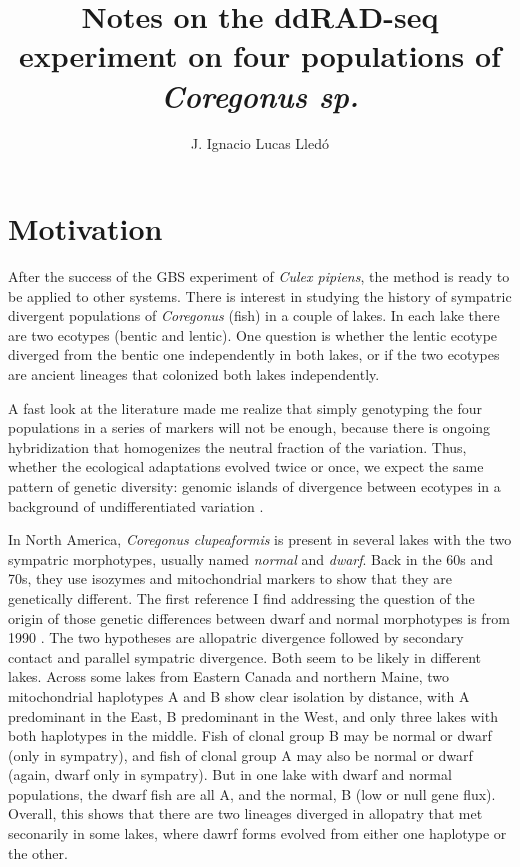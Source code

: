 \documentclass[a4paper,12pt,twosided]{article}
\author{J. Ignacio Lucas Lledó}
\title{Notes on the ddRAD-seq experiment on four populations of \emph{Coregonus sp.}}
\begin{document}
\maketitle
\section{Motivation}
After the success of the GBS experiment of \emph{Culex pipiens}, the method is ready to be applied to other systems. There is interest in studying the history of sympatric divergent populations of \emph{Coregonus} (fish) in a couple of lakes. In each lake there are two ecotypes (bentic and lentic). One question is whether the lentic ecotype diverged from the bentic one independently in both lakes, or if the two ecotypes are ancient lineages that colonized both lakes independently.

A fast look at the literature made me realize that simply genotyping the four populations in a series of markers will not be enough, because there is ongoing hybridization that homogenizes the neutral fraction of the variation. Thus, whether the ecological adaptations evolved twice or once, we expect the same pattern of genetic diversity: genomic islands of divergence between ecotypes in a background of undifferentiated variation \cite{Bierne2013}.

In North America, \emph{Coregonus clupeaformis} is present in several lakes with the two sympatric morphotypes, usually named \emph{normal} and \emph{dwarf}. Back in the 60s and 70s, they use isozymes and mitochondrial markers to show that they are genetically different. The first reference I find addressing the question of the origin of those genetic differences between dwarf and normal morphotypes is from 1990 \cite{Bernatchez1990}. The two hypotheses are allopatric divergence followed by secondary contact and parallel sympatric divergence. Both seem to be likely in different lakes. Across some lakes from Eastern Canada and northern Maine, two mitochondrial haplotypes A and B show clear isolation by distance, with A predominant in the East, B predominant in the West, and only three lakes with both haplotypes in the middle. Fish of clonal group B may be normal or dwarf (only in sympatry), and fish of clonal group A may also be normal or dwarf (again, dwarf only in sympatry). But in one lake with dwarf and normal populations, the dwarf fish are all A, and the normal, B (low or null gene flux). Overall, this shows that there are two lineages diverged in allopatry that met seconarily in some lakes, where dawrf forms evolved from either one haplotype or the other.
\end{document}

